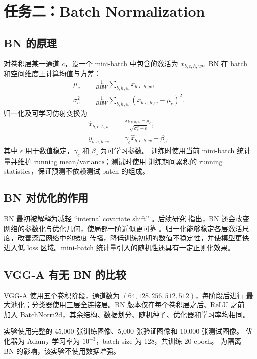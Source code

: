 \documentclass[UTF8,11pt,a4paper]{ctexart}
\begin{document}
\section{任务二：Batch Normalization}

\subsection{BN 的原理}

对卷积层某一通道 $c$，设一个 mini-batch 中包含的激活为
$x_{b,c,h,w}$。BN 在 batch 和空间维度上计算均值与方差：
\begin{align}
  \mu_c &=
  \frac{1}{BHW}\sum_{b,h,w}x_{b,c,h,w},\\
  \sigma_c^2 &=
  \frac{1}{BHW}\sum_{b,h,w}(x_{b,c,h,w}-\mu_c)^2.
\end{align}
归一化及可学习仿射变换为
\begin{align}
  \hat{x}_{b,c,h,w}
  &=\frac{x_{b,c,h,w}-\mu_c}{\sqrt{\sigma_c^2+\epsilon}},\\
  y_{b,c,h,w}&=\gamma_c\hat{x}_{b,c,h,w}+\beta_c.
\end{align}
其中 $\epsilon$ 用于数值稳定，$\gamma_c$ 和 $\beta_c$ 为可学习参数。
训练时使用当前 mini-batch 统计量并维护 running mean/variance；测试时使用
训练期间累积的 running statistics，保证预测不依赖测试 batch 的组成。

\subsection{BN 对优化的作用}

BN 最初被解释为减轻 ``internal covariate shift'' \cite{batchnorm}。后续研究
指出，BN 还会改变网络的参数化与优化几何，使局部一阶近似更可靠
\cite{santurkar2018}。归一化能够稳定各层激活尺度，改善深层网络中的梯度
传播，降低训练初期的数值不稳定性，并使模型更快进入低 loss 区域。mini-batch
统计量引入的随机性还具有一定正则化效果。

\subsection{VGG-A 有无 BN 的比较}

VGG-A 使用五个卷积阶段，通道数为 $(64,128,256,512,512)$，每阶段后进行
最大池化；分类器使用三层全连接层。BN 版本仅在每个卷积层之后、ReLU 之前
加入 BatchNorm2d，其余结构、数据划分、随机种子、优化器和学习率均相同。

实验使用完整的 45,000 张训练图像、5,000 张验证图像和 10,000 张测试图像。
优化器为 Adam，学习率为 $10^{-3}$，batch size 为 128，共训练 20 epoch。
为隔离 BN 的影响，该实验不使用数据增强。
\end{document}

